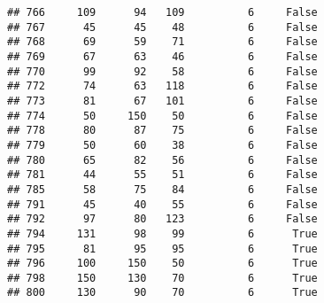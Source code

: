 \documentclass[
]{article}
\newenvironment{Shaded}{\begin{snugshade}}{\end{snugshade}}
\newcommand{\CommentTok}[1]{\textcolor[rgb]{0.56,0.35,0.01}{\textit{#1}}}
\newcommand{\DecValTok}[1]{\textcolor[rgb]{0.00,0.00,0.81}{#1}}
\newcommand{\FloatTok}[1]{\textcolor[rgb]{0.00,0.00,0.81}{#1}}
\newcommand{\FunctionTok}[1]{\textcolor[rgb]{0.00,0.00,0.00}{#1}}
\newcommand{\NormalTok}[1]{#1}
\newcommand{\OtherTok}[1]{\textcolor[rgb]{0.56,0.35,0.01}{#1}}
\newcommand{\SpecialCharTok}[1]{\textcolor[rgb]{0.00,0.00,0.00}{#1}}
\begin{document}
\begin{verbatim}
## 766     109      94   109          6     False
## 767      45      45    48          6     False
## 768      69      59    71          6     False
## 769      67      63    46          6     False
## 770      99      92    58          6     False
## 772      74      63   118          6     False
## 773      81      67   101          6     False
## 774      50     150    50          6     False
## 778      80      87    75          6     False
## 779      50      60    38          6     False
## 780      65      82    56          6     False
## 781      44      55    51          6     False
## 785      58      75    84          6     False
## 791      45      40    55          6     False
## 792      97      80   123          6     False
## 794     131      98    99          6      True
## 795      81      95    95          6      True
## 796     100     150    50          6      True
## 798     150     130    70          6      True
## 800     130      90    70          6      True
\end{verbatim}

\begin{Shaded}
\end{Shaded}
\end{document}
